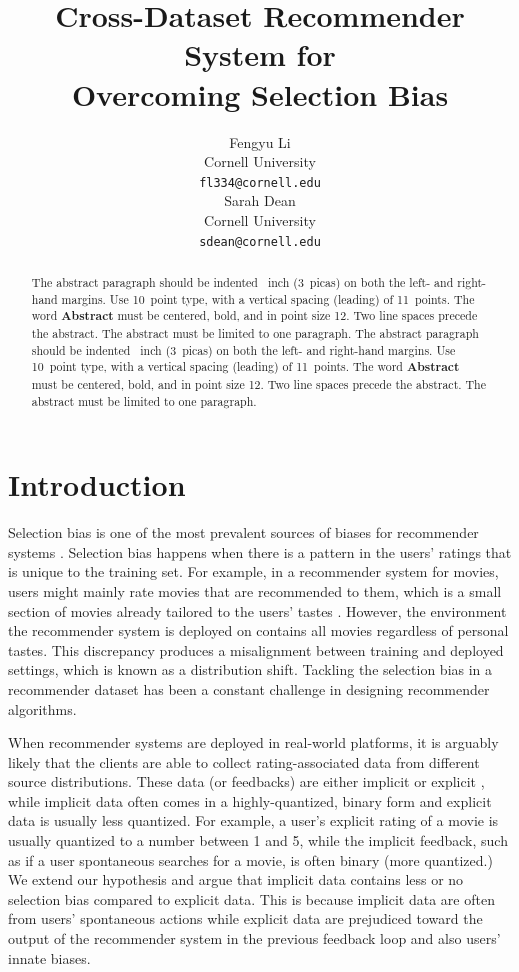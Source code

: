 \documentclass{article}
\title{Cross-Dataset Recommender System for \\Overcoming Selection Bias}
\author{%
  Fengyu Li \\
  Cornell University\\
  \texttt{fl334@cornell.edu} \\
  \And
  Sarah Dean \\
  Cornell University \\
  \texttt{sdean@cornell.edu} \\
}
\begin{document}
\maketitle


\begin{abstract}
  The abstract paragraph should be indented ~inch (3~picas) on
  both the left- and right-hand margins. Use 10~point type, with a vertical
  spacing (leading) of 11~points.  The word \textbf{Abstract} must be centered,
  bold, and in point size 12. Two line spaces precede the abstract. The abstract
  must be limited to one paragraph. The abstract paragraph should be indented ~inch (3~picas) on
  both the left- and right-hand margins. Use 10~point type, with a vertical
  spacing (leading) of 11~points.  The word \textbf{Abstract} must be centered,
  bold, and in point size 12. Two line spaces precede the abstract. The abstract
  must be limited to one paragraph.
\end{abstract}

\section{Introduction}
Selection bias is one of the most prevalent sources of biases for recommender systems \cite{chen2020bias}. Selection bias happens when there is a pattern in the users' ratings that is unique to the training set. For example, in a recommender system for movies, users might mainly rate movies that are recommended to them, which is a small section of movies already tailored to the users' tastes \cite{pradel2012ranking}. However, the environment the recommender system is deployed on contains all movies regardless of personal tastes. This discrepancy produces a misalignment between training and deployed settings, which is known as a distribution shift. Tackling the selection bias in a recommender dataset has been a constant challenge in designing recommender algorithms\cite{schnabel2016recommendations}.

When recommender systems are deployed in real-world platforms, it is arguably likely that the clients are able to collect rating-associated data from different source distributions. These data (or feedbacks) are either implicit or explicit \cite{aggarwal2016recommender}, while implicit data often comes in a highly-quantized, binary form and explicit data is usually less quantized. For example, a user's explicit rating of a movie is usually quantized to a number between 1 and 5, while the implicit feedback, such as if a user spontaneous searches for a movie, is often binary (more quantized.) We extend our hypothesis and argue that implicit data contains less or no selection bias compared to explicit data. This is because implicit data are often from users' spontaneous actions while explicit data are prejudiced toward the output of the recommender system in the previous feedback loop and also users' innate biases.
\end{document}
